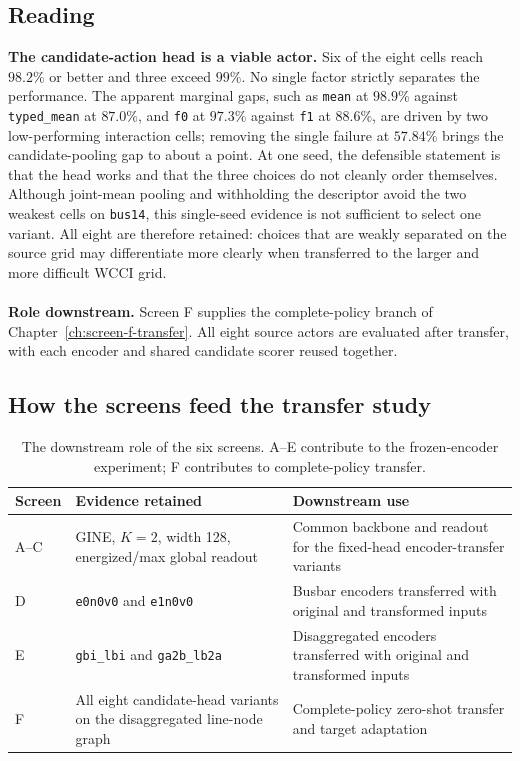 \subsection*{Reading}
\textbf{The candidate-action head is a viable actor.} Six of the eight cells reach $98.2\%$ or better and three exceed
$99\%$. No single factor strictly separates the performance. The apparent marginal gaps, such as \texttt{mean} at
$98.9\%$ against \texttt{typed\_mean} at $87.0\%$, and \texttt{f0} at $97.3\%$
against \texttt{f1} at $88.6\%$, are driven by two low-performing interaction cells; removing the
single failure at $57.84\%$ brings the candidate-pooling gap to about a point. At one seed,
the defensible statement is that the head works and that the three choices do
not cleanly order themselves. Although joint-mean pooling and
withholding the descriptor avoid the two weakest cells on \texttt{bus14}, this
single-seed evidence is not sufficient to select one variant. All eight are
therefore retained: choices that are weakly separated on the source grid may
differentiate more clearly when transferred to the larger and more difficult
WCCI grid.
\\
\\
\noindent\textbf{Role downstream.} Screen F supplies the
complete-policy branch of Chapter~\ref{ch:screen-f-transfer}. All eight source
actors are evaluated after transfer, with each encoder and shared candidate
scorer reused together.

\begingroup
\color{red}
\subsection*{How the screens feed the transfer study}

\begin{table}[H]
  \centering
  \small
  \caption{The downstream role of the six screens. A--E
  contribute to the frozen-encoder experiment; F contributes to
  complete-policy transfer.}
  \label{tab:screen-downstream-role}
  \setlength{\tabcolsep}{5pt}
  \begin{tabular}{L{0.10\textwidth}L{0.34\textwidth}L{0.43\textwidth}}
    \toprule
    Screen & Evidence retained & Downstream use \\
    \midrule
    A--C & GINE, $K=2$, width 128, energized/max global readout & Common backbone and readout for the fixed-head encoder-transfer variants \\
    D & \texttt{e0n0v0} and \texttt{e1n0v0} & Busbar encoders transferred with original and transformed inputs \\
    E & \texttt{gbi\_lbi} and \texttt{ga2b\_lb2a} & Disaggregated encoders transferred with original and transformed inputs \\
    F & All eight candidate-head variants on the disaggregated line-node graph & Complete-policy zero-shot transfer and target adaptation \\
    \bottomrule
  \end{tabular}
\end{table}


